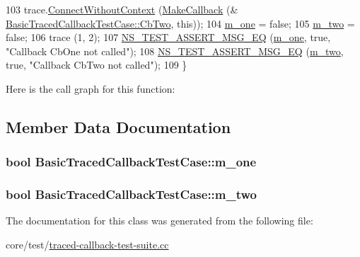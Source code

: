 \begin{DoxyCode}
103   trace.\hyperlink{classns3_1_1TracedCallback_aacc251bf4e302e7d034e9f0e25a15980}{ConnectWithoutContext} (\hyperlink{group__makecallbackmemptr_ga9376283685aa99d204048d6a4b7610a4}{MakeCallback} (&
      \hyperlink{classBasicTracedCallbackTestCase_add7162ae75a89256e2528a94d442847d}{BasicTracedCallbackTestCase::CbTwo}, \textcolor{keyword}{this}));
104   \hyperlink{classBasicTracedCallbackTestCase_a64847386a4cf0d07aac0c23639501444}{m\_one} = \textcolor{keyword}{false};
105   \hyperlink{classBasicTracedCallbackTestCase_ae8f2b2a6115490efe626394a676e6da1}{m\_two} = \textcolor{keyword}{false};
106   trace (1, 2);
107   \hyperlink{group__testing_ga2a9d78cffb3db8e867c35fff0b698cf5}{NS\_TEST\_ASSERT\_MSG\_EQ} (\hyperlink{classBasicTracedCallbackTestCase_a64847386a4cf0d07aac0c23639501444}{m\_one}, \textcolor{keyword}{true}, \textcolor{stringliteral}{"Callback CbOne not called"});
108   \hyperlink{group__testing_ga2a9d78cffb3db8e867c35fff0b698cf5}{NS\_TEST\_ASSERT\_MSG\_EQ} (\hyperlink{classBasicTracedCallbackTestCase_ae8f2b2a6115490efe626394a676e6da1}{m\_two}, \textcolor{keyword}{true}, \textcolor{stringliteral}{"Callback CbTwo not called"});
109 \}
\end{DoxyCode}


Here is the call graph for this function\+:




\subsection{Member Data Documentation}
\subsubsection[{\texorpdfstring{m\+\_\+one}{m_one}}]{\setlength{\rightskip}{0pt plus 5cm}bool Basic\+Traced\+Callback\+Test\+Case\+::m\+\_\+one\hspace{0.3cm}{\ttfamily [private]}}\hypertarget{classBasicTracedCallbackTestCase_a64847386a4cf0d07aac0c23639501444}{}\label{classBasicTracedCallbackTestCase_a64847386a4cf0d07aac0c23639501444}
\subsubsection[{\texorpdfstring{m\+\_\+two}{m_two}}]{\setlength{\rightskip}{0pt plus 5cm}bool Basic\+Traced\+Callback\+Test\+Case\+::m\+\_\+two\hspace{0.3cm}{\ttfamily [private]}}\hypertarget{classBasicTracedCallbackTestCase_ae8f2b2a6115490efe626394a676e6da1}{}\label{classBasicTracedCallbackTestCase_ae8f2b2a6115490efe626394a676e6da1}


The documentation for this class was generated from the following file\+:\begin{DoxyCompactItemize}
\item 
core/test/\hyperlink{traced-callback-test-suite_8cc}{traced-\/callback-\/test-\/suite.\+cc}\end{DoxyCompactItemize}
